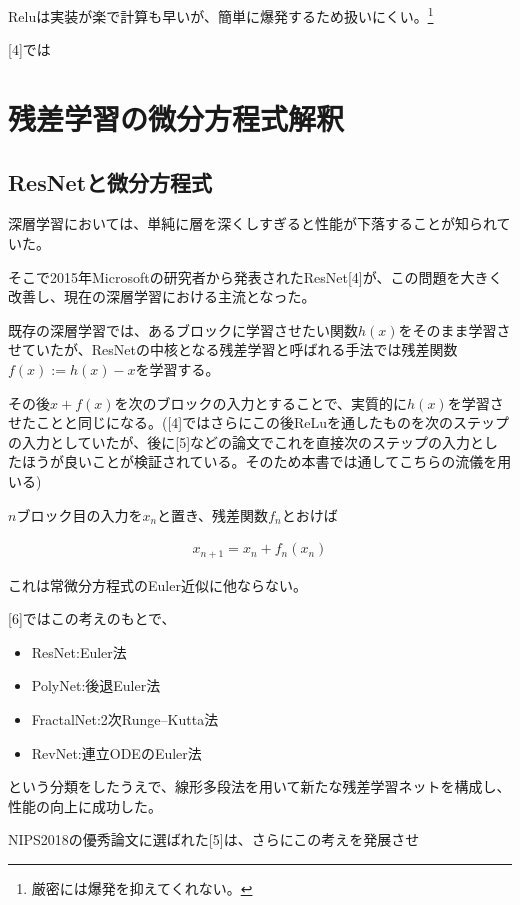 \documentclass{jsarticle}
\begin{document}
Reluは実装が楽で計算も早いが、簡単に爆発するため扱いにくい。\footnote{厳密には爆発を抑えてくれない。}

[4]では



\newpage

\section{残差学習の微分方程式解釈}



\subsection{ResNetと微分方程式}
深層学習においては、単純に層を深くしすぎると性能が下落することが知られていた。

そこで2015年Microsoftの研究者から発表されたResNet[4]が、この問題を大きく改善し、現在の深層学習における主流となった。

既存の深層学習では、あるブロックに学習させたい関数$h(x)$をそのまま学習させていたが、ResNetの中核となる残差学習と呼ばれる手法では残差関数$f(x):=h(x)-x$を学習する。

その後$x+f(x)$を次のブロックの入力とすることで、実質的に$h(x)$を学習させたことと同じになる。([4]ではさらにこの後ReLuを通したものを次のステップの入力としていたが、後に[5]などの論文でこれを直接次のステップの入力としたほうが良いことが検証されている。そのため本書では通してこちらの流儀を用いる)

$n$ブロック目の入力を$x_n$と置き、残差関数$f_n$とおけば

\begin{align}
x_{n+1}=x_n+f_n(x_n)
\end{align}

これは常微分方程式のEuler近似に他ならない。




[6]ではこの考えのもとで、

\begin{itemize}
\item ResNet:Euler法
\item PolyNet:後退Euler法
\item FractalNet:2次Runge–Kutta法
\item RevNet:連立ODEのEuler法
\end{itemize}

という分類をしたうえで、線形多段法を用いて新たな残差学習ネットを構成し、性能の向上に成功した。

NIPS2018の優秀論文に選ばれた[5]は、さらにこの考えを発展させ
\end{document}
